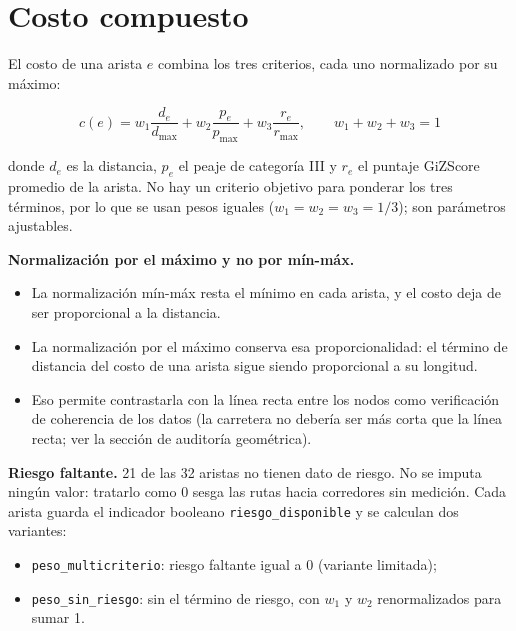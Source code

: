 \documentclass[12pt,a4paper]{article}
\begin{document}
\begin{table}[H]
\centering
\caption{Estadísticas del grafo}
\label{tab:estadisticas}

\end{table}

\section{Costo compuesto}

El costo de una arista $e$ combina los tres criterios, cada uno normalizado
por su máximo:

\begin{equation}
c(e) = w_1 \frac{d_e}{d_{\max}} + w_2 \frac{p_e}{p_{\max}}
     + w_3 \frac{r_e}{r_{\max}}, \qquad w_1 + w_2 + w_3 = 1
\end{equation}

donde $d_e$ es la distancia, $p_e$ el peaje de categoría III y $r_e$ el
puntaje GiZScore promedio de la arista. No hay un criterio objetivo para
ponderar los tres términos, por lo que se usan pesos iguales
($w_1=w_2=w_3=1/3$); son parámetros ajustables.

\textbf{Normalización por el máximo y no por mín-máx.}
\begin{itemize}
\item La normalización mín-máx resta el mínimo en cada arista, y el costo deja
de ser proporcional a la distancia.
\item La normalización por el máximo conserva esa proporcionalidad: el término
de distancia del costo de una arista sigue siendo proporcional a su longitud.
\item Eso permite contrastarla con la línea recta entre los nodos como
verificación de coherencia de los datos (la carretera no debería ser más corta
que la línea recta; ver la sección de auditoría geométrica).
\end{itemize}

\textbf{Riesgo faltante.} 21 de las 32 aristas no tienen dato de riesgo. No se
imputa ningún valor: tratarlo como 0 sesga las rutas hacia corredores sin
medición. Cada arista guarda el indicador booleano
\texttt{riesgo\_disponible} y se calculan dos variantes:

\begin{itemize}
\item \texttt{peso\_multicriterio}: riesgo faltante igual a 0 (variante
limitada);
\item \texttt{peso\_sin\_riesgo}: sin el término de riesgo, con $w_1$ y $w_2$
renormalizados para sumar 1.
\end{itemize}
\end{document}
